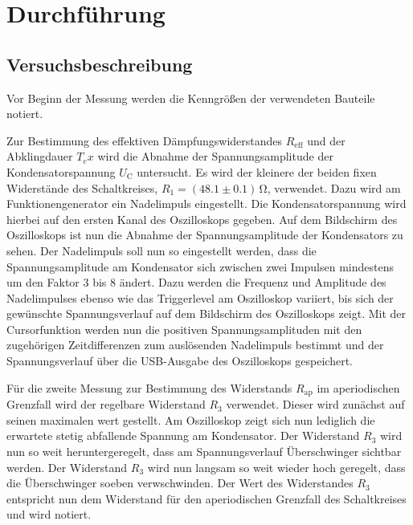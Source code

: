 \section{Durchführung}
\label{sec:Durchführung}



\subsection{Versuchsbeschreibung}
\label{sec:Versuchsbeschreibung}

Vor Beginn der Messung werden die Kenngrößen der verwendeten Bauteile notiert.

Zur Bestimmung des effektiven Dämpfungswiderstandes $R_\text{eff}$ und der Abklingdauer $T_ex$ wird die Abnahme der Spannungsamplitude der Kondensatorspannung $U_\text{C}$ untersucht.
Es wird der kleinere der beiden fixen Widerstände des Schaltkreises, $R_\text{1}=(48.1 \pm 0.1)\,\si{\ohm}$, verwendet.
Dazu wird am Funktionengenerator ein Nadelimpuls eingestellt.
Die Kondensatorspannung wird hierbei auf den ersten Kanal des Oszilloskops gegeben.
Auf dem Bildschirm des Oszilloskops ist nun die Abnahme der Spannungsamplitude der Kondensators zu sehen.
Der Nadelimpuls soll nun so eingestellt werden, dass die Spannungsamplitude am Kondensator sich zwischen zwei Impulsen mindestens um den Faktor 3 bis 8 ändert.
Dazu werden die Frequenz und Amplitude des Nadelimpulses ebenso wie das Triggerlevel am Oszilloskop variiert, bis sich der gewünschte Spannungsverlauf auf dem Bildschirm des Oszilloskops zeigt.
Mit der Cursorfunktion werden nun die positiven Spannungsamplituden mit den zugehörigen Zeitdifferenzen zum auslösenden Nadelimpuls bestimmt und der Spannungsverlauf über die USB-Ausgabe des Oszilloskops gespeichert.

Für die zweite Messung zur Bestimmung des Widerstands $R_\text{ap}$ im aperiodischen Grenzfall wird der regelbare Widerstand $R_\text{3}$ verwendet.
Dieser wird zunächst auf seinen maximalen wert gestellt. Am Oszilloskop zeigt sich nun lediglich die erwartete stetig abfallende Spannung am Kondensator.
Der Widerstand $R_\text{3}$ wird nun so weit heruntergeregelt, dass am Spannungsverlauf Überschwinger sichtbar werden.
Der Widerstand $R_\text{3}$ wird nun langsam so weit wieder hoch geregelt, dass die Überschwinger soeben verwschwinden. Der Wert des Widerstandes $R_\text{3}$ entspricht nun dem Widerstand für den aperiodischen Grenzfall des Schaltkreises und wird notiert.

